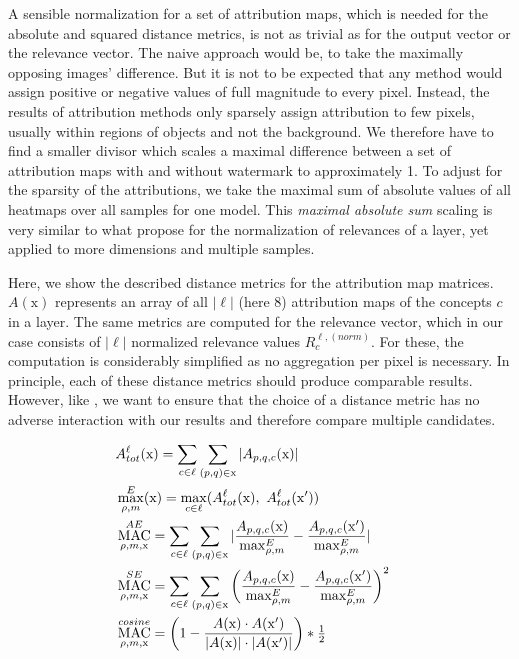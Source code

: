A sensible normalization for a set of attribution maps, which is needed for the absolute and squared distance metrics, is not as trivial as for the output vector or the relevance vector. The naive approach would be, to take the maximally opposing images' difference. But it is not to be expected that any method would assign positive or negative values of full magnitude to every pixel. Instead, the results of attribution methods only sparsely assign attribution to few pixels, usually within regions of objects and not the background. 
We therefore have to find a smaller divisor which scales a maximal difference between a set of attribution maps with and without watermark to approximately 1.
To adjust for the sparsity of the attributions, we take the maximal sum of absolute values of all heatmaps over all samples for one model. This \textit{maximal absolute sum} scaling is very similar to what \citet{Achtibat2022} propose for the normalization of relevances of a layer, yet applied to more dimensions and multiple samples.

Here, we show the described distance metrics for the attribution map matrices. $A(\mathrm{x})$ represents an array of all $|\ell|$ (here 8) attribution maps of the concepts $c$ in a layer. The same metrics are computed for the relevance vector, which in our case consists of $|\ell|$ normalized relevance values $R_{c}^{\ell,(norm)}$. For these, the computation is considerably simplified as no aggregation per pixel is necessary. In principle, each of these distance metrics should produce comparable results. However, like \citet{Karimi2023}, we want to ensure that the choice of a distance metric has no adverse interaction with our results and therefore compare multiple candidates.

\begin{align}
\displaystyle 
& A_{tot}^{\ell}(\mathrm{x}) = \sum_{c \in \ell} \sum_{(p,q) \in \mathrm{x}} |A_{p,q,c}(\mathrm{x})|  \label{eq:total_absolute_relevance} & \\
& \max_{\rho, m}^E(\mathrm{x}) = \max_{c \in \ell} (A_{tot}^{\ell}(\mathrm{x}) , \  A_{tot}^{\ell}(\mathrm{x'}) ) & \\
& \operatorname*{MAC}_{\rho, m, \mathrm{x}}^{AE} = 
\sum_{c \in \ell} \sum_{(p,q) \in \mathrm{x}}| \frac{A_{p,q,c}(\mathrm{x})}{\max_{\rho, m}^E} -\frac{A_{p,q,c}(\mathrm{x'})}{\max_{\rho, m}^E}| & \\
& \operatorname*{MAC}_{\rho, m, \mathrm{x}}^{SE} = 
\sum_{c \in \ell} \sum_{(p,q) \in \mathrm{x}} \left( \frac{A_{p,q,c}(\mathrm{x})}{\max_{\rho, m}^E} -\frac{A_{p,q,c}(\mathrm{x'})}{\max_{\rho, m}^E}\right) ^2 & \\
& \operatorname*{MAC}_{\rho, m,\mathrm{x}}^{cosine} = \left( 1- 
\frac{A(\mathrm{x}) \cdot A(\mathrm{x'}) }{|A(\mathrm{x})|\cdot |A(\mathrm{x'})|}\right) * \tfrac{1}{2} &
\end{align}

